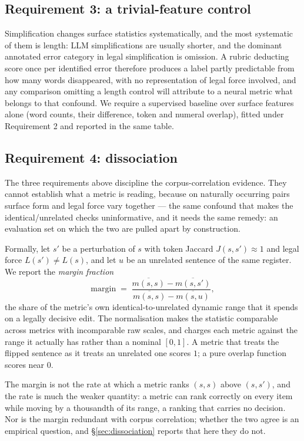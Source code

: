 \documentclass[11pt]{article}
\begin{document}
\subsection{Requirement 3: a trivial-feature control}

Simplification changes surface statistics systematically, and the most
systematic of them is length: LLM simplifications are usually shorter, and the
dominant annotated error category in legal simplification is omission. A rubric
deducting score once per identified error therefore produces a label partly
predictable from how many words disappeared, with no representation of legal
force involved, and any comparison omitting a length control will attribute to a
neural metric what belongs to that confound. We require a supervised baseline
over surface features alone (word counts, their difference, token and numeral
overlap), fitted under Requirement 2 and reported in the same table.

\subsection{Requirement 4: dissociation}

The three requirements above discipline the corpus-correlation evidence. They
cannot establish what a metric is reading, because on naturally occurring pairs
surface form and legal force vary together --- the same confound that makes the
identical/unrelated checks uninformative, and it needs the same remedy: an
evaluation set on which the two are pulled apart by construction.

Formally, let $s'$ be a perturbation of $s$ with token Jaccard
$J(s,s') \approx 1$ and legal force $L(s') \neq L(s)$, and let $u$ be an
unrelated sentence of the same register. We report the \emph{margin fraction}
\[
\text{margin} \;=\; \frac{\overline{m(s,s)} - \overline{m(s,s')}}
                          {\overline{m(s,s)} - \overline{m(s,u)}},
\]
the share of the metric's own identical-to-unrelated dynamic range that it
spends on a legally decisive edit. The normalisation makes the statistic
comparable across metrics with incomparable raw scales, and charges each metric
against the range it actually has rather than a nominal $[0,1]$. A metric that
treats the flipped sentence as it treats an unrelated one scores $1$; a pure
overlap function scores near $0$.

The margin is not the rate at which a metric ranks $(s,s)$ above $(s,s')$, and
the rate is much the weaker quantity: a metric can rank correctly on every item
while moving by a thousandth of its range, a ranking that carries no decision.
Nor is the margin redundant with corpus correlation; whether the two agree is an
empirical question, and \S\ref{sec:dissociation} reports that here they do not.
\end{document}

